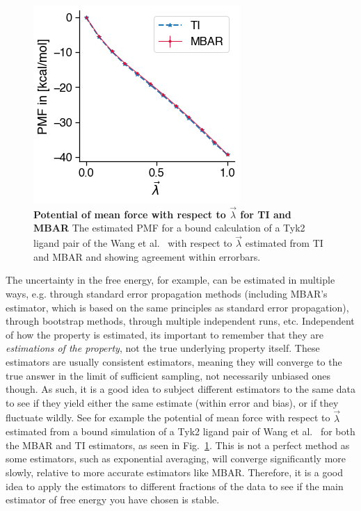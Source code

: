 \documentclass[9pt,bestpractices]{livecoms}
\begin{document}
\begin{figure}
    \centering
    \includegraphics[width=0.8\linewidth]{figures/fig_pmf/pmf.png}
    \caption{{\bf Potential of mean force with respect to $\vec{\lambda}$ for TI and MBAR}
    The estimated PMF for a bound calculation of a Tyk2 ligand pair of the Wang et al.~\cite{wang2015accurate} with respect to $\vec{\lambda}$ estimated from TI and MBAR and showing agreement within errorbars. 
    }
    \label{fig:pmf}
\end{figure}

The uncertainty in the free energy, for example, can be estimated in multiple ways, e.g. through standard error propagation methods (including MBAR's estimator, which is based on the same principles as standard error propagation), through bootstrap methods, through multiple independent runs, etc. 
Independent of how the property is estimated, its important to remember that they are \textit{estimations of the property}, not the true underlying property itself. 
These estimators are usually consistent estimators, meaning they will converge to the true answer in the limit of sufficient sampling, not necessarily unbiased ones though.
As such, it is a good idea to subject different estimators to the same data to see if they yield either the same estimate (within error and bias), or if they fluctuate wildly. See for example the potential of mean force with respect to $\vec{\lambda}$ estimated from a bound simulation of a Tyk2 ligand pair of Wang et al.~\cite{wang2015accurate} for both the MBAR and TI estimators, as seen in Fig.~\ref{fig:pmf}.
This is not a perfect method as some estimators, such as exponential averaging, will converge significantly more slowly, relative to more accurate estimators like MBAR. 
Therefore, it is a good idea to apply the estimators to different fractions of the data to see if the main estimator of free energy you have chosen is stable.
\end{document}
